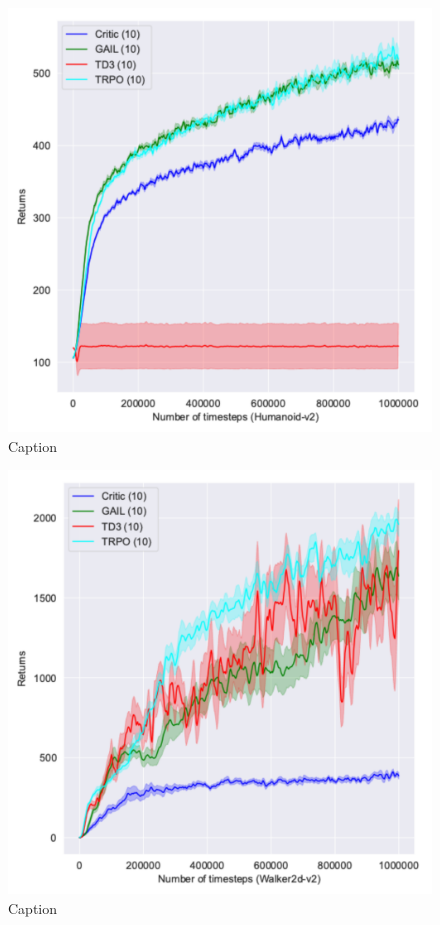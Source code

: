 \begin{figure}
    \centering
    \includegraphics[width=.7\linewidth]{figures/Humanoid.pdf}
    \caption{Caption}
\end{figure}

\begin{figure}
    \centering
    \includegraphics[width=.7\linewidth]{figures/Walker2d.pdf}
    \caption{Caption}
\end{figure}
